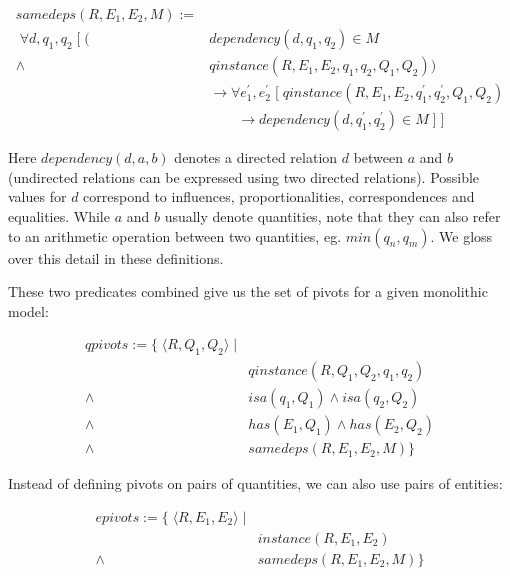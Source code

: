 \documentclass{article} %
\begin{document}
\begin{align*}
samedeps(R, E_1, E_2, M) := \\
	\; \forall d, q_1, q_2 \; [ \; 
	(&dependency(d, q_1, q_2) \in M \\
	\land \; &qinstance(R, E_1, E_2, q_1, q_2, Q_1, Q_2)) \\
	& 	\rightarrow \forall e^\prime_1, e^\prime_2 \; [ \;
	 qinstance(R, E_1, E_2, q^\prime_1, q^\prime_2, Q_1, Q_2) \\
	& \qquad \rightarrow dependency(d, q^\prime_1, q^\prime_2) \in M \; ] \; ]
\end{align*}

Here $dependency(d, a, b)$ denotes a directed relation $d$ between $a$
and $b$ (undirected relations can be expressed using two directed relations).
Possible values for $d$ correspond to influences, proportionalities,
correspondences and equalities. While $a$ and $b$ usually denote quantities,
note that they can also refer to an arithmetic operation between two
quantities, eg. $min(q_n, q_m)$. We gloss over this detail in these
definitions.

These two predicates combined give us the set of pivots for a given
monolithic model:

\begin{align*}
qpivots := \{ \; \langle R, Q_1, Q_2 \rangle \; | \\
	\; &qinstance(R, Q_1, Q_2, q_1, q_2) \\
	\land \; &isa(q_1, Q_1) \land isa(q_2, Q_2) \\
	\land \; &has(E_1, Q_1) \land has(E_2, Q_2) \\
	\land \; &samedeps(R, E_1, E_2, M) \} 
\end{align*}

Instead of defining pivots on pairs of quantities, we can also use pairs
of entities:

\begin{align*}
epivots := \{ \; \langle R, E_1, E_2 \rangle \; | \\ 
	\; &instance(R, E_1, E_2)  \\
	\land &samedeps(R, E_1, E_2, M) \} 
\end{align*}
\end{document}
